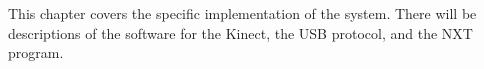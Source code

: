 This chapter covers the specific implementation of the system. There will be descriptions of the software for the Kinect, the USB protocol, and the NXT program.
